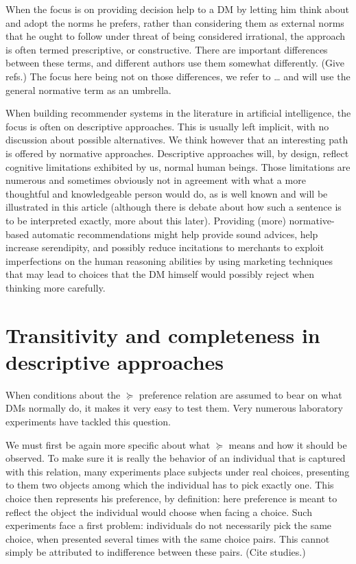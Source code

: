\documentclass[french, english]{llncs}
\begin{document}
When the focus is on providing decision help to a \ac{DM} by letting him think about and adopt the norms he prefers, rather than considering them as external norms that he ought to follow under threat of being considered irrational, the approach is often termed prescriptive, or constructive. There are important differences between these terms, and different authors use them somewhat differently. (Give refs.) The focus here being not on those differences, we refer to … and will use the general normative term as an umbrella.

When building recommender systems in the literature in artificial intelligence, the focus is often on descriptive approaches. This is usually left implicit, with no discussion about possible alternatives. We think however that an interesting path is offered by normative approaches. Descriptive approaches will, by design, reflect cognitive limitations exhibited by us, normal human beings. Those limitations are numerous and sometimes obviously not in agreement with what a more thoughtful and knowledgeable person would do, as is well known and will be illustrated in this article (although there is debate about how such a sentence is to be interpreted exactly, more about this later). Providing (more) normative-based automatic recommendations might help provide sound advices, help increase serendipity, and possibly reduce incitations to merchants to exploit imperfections on the human reasoning abilities by using marketing techniques that may lead to choices that the \ac{DM} himself would possibly reject when thinking more carefully. 

\section{Transitivity and completeness in descriptive approaches}
When conditions about the $\succeq$ preference relation are assumed to bear on what \acp{DM} normally do, it makes it very easy to test them. Very numerous laboratory experiments have tackled this question.

We must first be again more specific about what $\succeq$ means and how it should be observed. To make sure it is really the behavior of an individual that is captured with this relation, many experiments place subjects under real choices, presenting to them two objects among which the individual has to pick exactly one. This choice then represents his preference, by definition: here preference is meant to reflect the object the individual would choose when facing a choice. Such experiments face a first problem: individuals do not necessarily pick the same choice, when presented several times with the same choice pairs. This cannot simply be attributed to indifference between these pairs. (Cite studies.)
\end{document}
